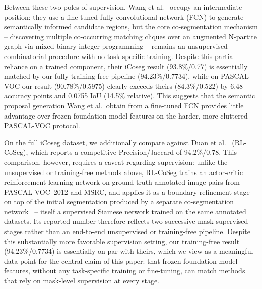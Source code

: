 Between these two poles of supervision, Wang et al.~\cite{wang2017nparitite} occupy an intermediate position: they use a fine-tuned fully convolutional network (FCN) to generate semantically informed candidate regions, but the core co-segmentation mechanism -- discovering multiple co-occurring matching cliques over an augmented N-partite graph via mixed-binary integer programming -- remains an unsupervised combinatorial procedure with no task-specific training. Despite this partial reliance on a trained component, their iCoseg result (93.8\%/0.77) is essentially matched by our fully training-free pipeline (94.23\%/0.7734), while on PASCAL-VOC our result (90.78\%/0.5975) clearly exceeds theirs (84.3\%/0.522) by 6.48 accuracy points and 0.0755 IoU (14.5\% relative). This suggests that the semantic proposal generation Wang et al.\ obtain from a fine-tuned FCN provides little advantage over frozen foundation-model features on the harder, more cluttered PASCAL-VOC protocol.

On the full iCoseg dataset, we additionally compare against Duan et al.~\cite{duan2022rlcoseg} (RL-CoSeg), which reports a competitive Precision/Jaccard of 94.2\%/0.78. This comparison, however, requires a caveat regarding supervision: unlike the unsupervised or training-free methods above, RL-CoSeg trains an actor-critic reinforcement learning network on ground-truth-annotated image pairs from PASCAL VOC~2012 and MSRC, and applies it as a boundary-refinement stage on top of the initial segmentation produced by a separate co-segmentation network~\cite{gong2020} -- itself a supervised Siamese network trained on the same annotated datasets. Its reported number therefore reflects two successive mask-supervised stages rather than an end-to-end unsupervised or training-free pipeline. Despite this substantially more favorable supervision setting, our training-free result (94.23\%/0.7734) is essentially on par with theirs, which we view as a meaningful data point for the central claim of this paper: that frozen foundation-model features, without any task-specific training or fine-tuning, can match methods that rely on mask-level supervision at every stage.

